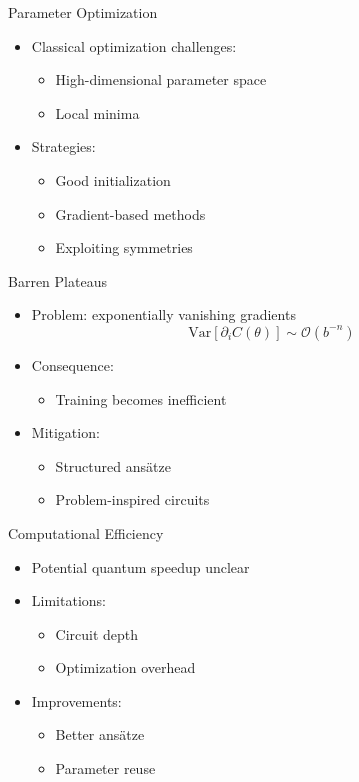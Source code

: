\documentclass{beamer}
\begin{document}

\begin{frame}{Parameter Optimization}
\begin{itemize}
\item Classical optimization challenges:
\begin{itemize}
\item High-dimensional parameter space
\item Local minima
\end{itemize}
\item Strategies:
\begin{itemize}
\item Good initialization
\item Gradient-based methods
\item Exploiting symmetries
\end{itemize}
\end{itemize}
\end{frame}


\begin{frame}{Barren Plateaus}
\begin{itemize}
\item Problem: exponentially vanishing gradients
\[
\text{Var}[\partial_i C(\theta)] \sim \mathcal{O}(b^{-n})
\]
\item Consequence:
\begin{itemize}
\item Training becomes inefficient
\end{itemize}
\item Mitigation:
\begin{itemize}
\item Structured ansätze
\item Problem-inspired circuits
\end{itemize}
\end{itemize}
\end{frame}


\begin{frame}{Computational Efficiency}
\begin{itemize}
\item Potential quantum speedup unclear
\item Limitations:
\begin{itemize}
\item Circuit depth
\item Optimization overhead
\end{itemize}
\item Improvements:
\begin{itemize}
\item Better ansätze
\item Parameter reuse
\end{itemize}
\end{itemize}
\end{frame}
\end{document}
